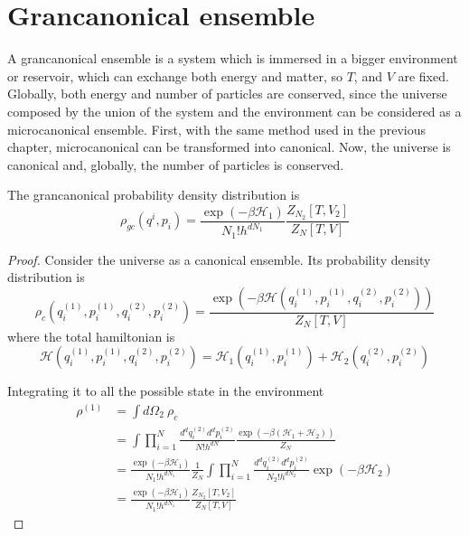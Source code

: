 \chapter{Grancanonical ensemble}

    A grancanonical ensemble is a system which is immersed in a bigger environment or reservoir, which can exchange both energy and matter, so $T$, and $V$ are fixed. Globally, both energy and number of particles are conserved, since the universe composed by the union of the system and the environment can be considered as a microcanonical ensemble. First, with the same method used in the previous chapter, microcanonical can be transformed into canonical. Now, the universe is canonical and, globally, the number of particles is conserved. 

    The grancanonical probability density distribution is 
    \begin{equation*}
        \rho_{gc} (q^i, p_i) = \frac{\exp(-\beta \mathcal H_1)}{N_1! h^{d N_1}} \frac{Z_{N_2} [T, V_2]}{Z_N [T, V]}
    \end{equation*}
    
    \begin{proof}
        Consider the universe as a canonical ensemble. Its probability density distribution is 
        \begin{equation*}
            \rho_c (q_i^{(1)}, p_i^{(1)}, q_i^{(2)}, p_i^{(2)}) = \frac{\exp (-\beta \mathcal H (q_i^{(1)}, p_i^{(1)}, q_i^{(2)}, p_i^{(2)}))}{Z_N[T, V]}
        \end{equation*}
        where the total hamiltonian is 
        \begin{equation*}
            \mathcal H (q_i^{(1)}, p_i^{(1)}, q_i^{(2)}, p_i^{(2)}) = \mathcal H_1 (q_i^{(1)}, p_i^{(1)}) + \mathcal H_2 (q_i^{(2)}, p_i^{(2)})
        \end{equation*}

        Integrating it to all the possible state in the environment
        \begin{equation*}
        \begin{aligned}
            \rho^{(1)} & = \int d\Omega_2 ~ \rho_c \\ & = \int \prod_{i=1}^N \frac{d^d q_i^{(2)} d^d p_i^{(2)}}{N! h^{dN}} \frac{\exp(-\beta (\mathcal H_1 + \mathcal H_2))}{Z_N} \\ & = \frac{\exp(-\beta \mathcal H_1)}{N_1! h^{d N_1}} \frac{1}{Z_N} \int \prod_{i=1}^N \frac{d^d q_i^{(2)} d^d p_i^{(2)}}{N_2! h^{d N_2}} \exp(-\beta \mathcal H_2) \\ & = \frac{\exp(-\beta \mathcal H_1)}{N_1! h^{d N_1}} \frac{Z_{N_2} [T, V_2]}{Z_N [T, V]}
        \end{aligned}
        \end{equation*}
    \end{proof}

